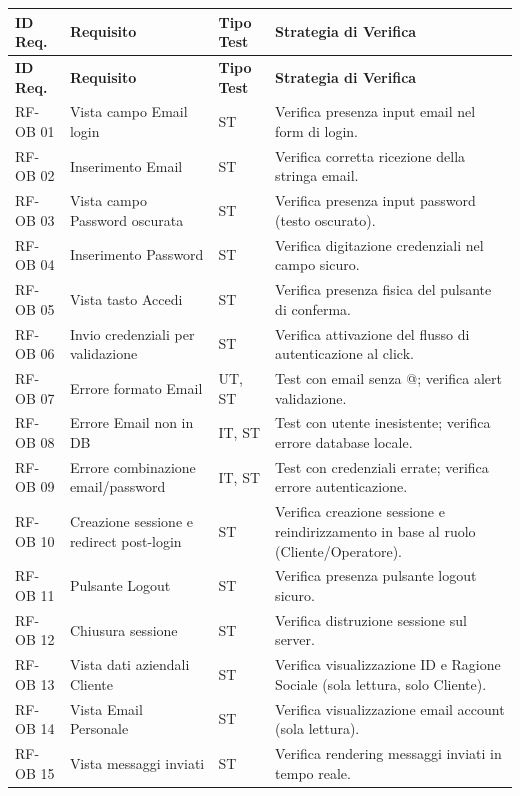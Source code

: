 \documentclass[a4paper,11pt,oneside]{scrartcl}
\begin{document}
\begin{longtable}{|p{1.5cm}|p{4.5cm}|p{1.8cm}|p{6cm}|}
\hline
\textbf{ID Req.} & \textbf{Requisito} & \textbf{Tipo Test} & \textbf{Strategia di Verifica} \\
\hline
\endfirsthead
\hline
\textbf{ID Req.} & \textbf{Requisito} & \textbf{Tipo Test} & \textbf{Strategia di Verifica} \\
\hline
\endhead

RF-OB 01 & Vista campo Email login & ST & Verifica presenza input email nel form di login. \\ \hline
RF-OB 02 & Inserimento Email & ST & Verifica corretta ricezione della stringa email. \\ \hline
RF-OB 03 & Vista campo Password oscurata & ST & Verifica presenza input password (testo oscurato). \\ \hline
RF-OB 04 & Inserimento Password & ST & Verifica digitazione credenziali nel campo sicuro. \\ \hline
RF-OB 05 & Vista tasto Accedi & ST & Verifica presenza fisica del pulsante di conferma. \\ \hline
RF-OB 06 & Invio credenziali per validazione & ST & Verifica attivazione del flusso di autenticazione al click. \\ \hline
RF-OB 07 & Errore formato Email & UT, ST & Test con email senza @; verifica alert validazione. \\ \hline
RF-OB 08 & Errore Email non in DB & IT, ST & Test con utente inesistente; verifica errore database locale. \\ \hline
RF-OB 09 & Errore combinazione email/password & IT, ST & Test con credenziali errate; verifica errore autenticazione. \\ \hline
RF-OB 10 & Creazione sessione e redirect post-login & ST & Verifica creazione sessione e reindirizzamento in base al ruolo (Cliente/Operatore). \\ \hline
RF-OB 11 & Pulsante Logout & ST & Verifica presenza pulsante logout sicuro. \\ \hline
RF-OB 12 & Chiusura sessione & ST & Verifica distruzione sessione sul server. \\ \hline
RF-OB 13 & Vista dati aziendali Cliente & ST & Verifica visualizzazione ID e Ragione Sociale (sola lettura, solo Cliente). \\ \hline
RF-OB 14 & Vista Email Personale & ST & Verifica visualizzazione email account (sola lettura). \\ \hline
RF-OB 15 & Vista messaggi inviati & ST & Verifica rendering messaggi inviati in tempo reale. \\ \hline

\end{longtable}
\end{document}
